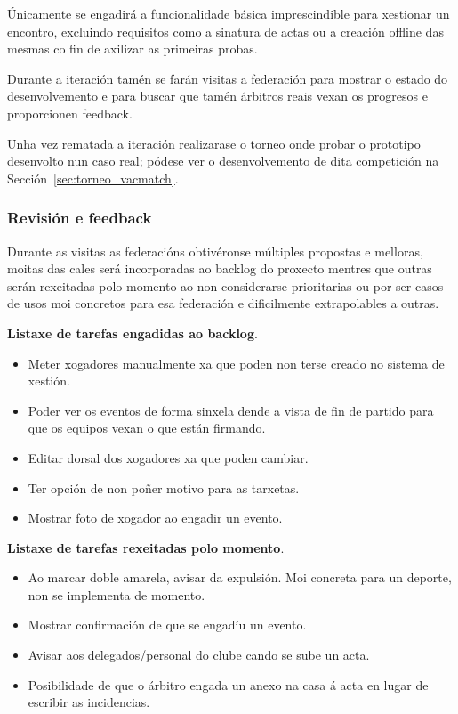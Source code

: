      Únicamente se engadirá a funcionalidade básica imprescindible para 
xestionar un encontro, excluindo requisitos como a sinatura de actas ou a 
creación offline das mesmas co fin de axilizar as primeiras probas.

      Durante a iteración tamén se farán visitas a federación para mostrar o 
estado do desenvolvemento e para buscar que tamén árbitros reais vexan os 
progresos e proporcionen feedback.

      Unha vez rematada a iteración realizarase o torneo onde probar o 
prototipo desenvolto nun caso real; pódese ver o desenvolvemento de dita 
competición na Sección~\ref{sec:torneo_vacmatch}.

      \subsubsection{Revisión e feedback}
      Durante as visitas as federacións obtivéronse múltiples propostas e 
melloras, moitas das cales será incorporadas ao backlog do proxecto mentres que 
outras serán rexeitadas polo momento ao non considerarse prioritarias ou por 
ser casos de usos moi concretos para esa federación e dificilmente 
extrapolables a outras.

      \textbf{Listaxe de tarefas engadidas ao backlog}.
        \begin{itemize}
          \item Meter xogadores manualmente xa que poden non terse creado no 
sistema de xestión.
          \item Poder ver os eventos de forma sinxela dende a vista de fin de 
partido para que os equipos vexan o que están firmando.
         \item Editar dorsal dos xogadores xa que poden cambiar.
         \item Ter opción de non poñer motivo para as tarxetas.
         \item Mostrar foto de xogador ao engadir un evento.
        \end{itemize}

      \textbf{Listaxe de tarefas rexeitadas polo momento}.
        \begin{itemize}
         \item Ao marcar doble amarela, avisar da expulsión. Moi concreta para 
un deporte, non se implementa de momento.
         \item Mostrar confirmación de que se engadíu un evento.
         \item Avisar aos delegados/personal do clube cando se sube un acta.
         \item Posibilidade de que o árbitro engada un anexo na casa á acta en 
lugar de escribir as incidencias.
        \end{itemize}

